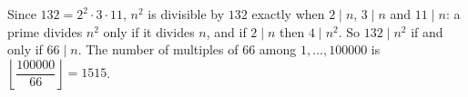 Since $132=2^2\cdot3\cdot11$, $n^2$ is divisible by $132$ exactly when $2\mid n$, $3\mid n$ and $11\mid n$: a prime divides $n^2$ only if it divides $n$, and if $2\mid n$ then $4\mid n^2$. So $132\mid n^2$ if and only if $66\mid n$. The number of multiples of $66$ among $1,\dots,100000$ is $\left\lfloor\dfrac{100000}{66}\right\rfloor=\boxed{1515}$.
